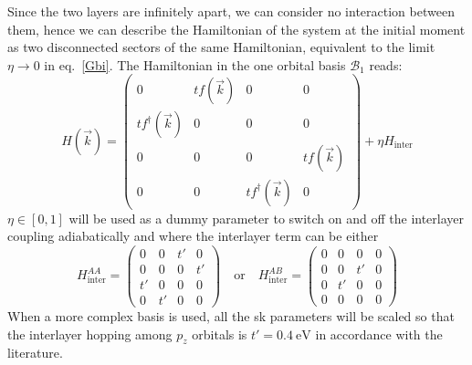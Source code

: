Since the two layers are infinitely apart, we can consider no interaction between them, hence we can describe the Hamiltonian of the system at the initial moment as two disconnected sectors of the same Hamiltonian, equivalent to the limit $\eta\rightarrow0$ in eq.~\eqref{Gbi}. The Hamiltonian in the one orbital basis $\mathcal{B}_1$ reads:
\begin{equation}
   H(\vec{k}) = \left(\begin{array}{cc|cc}
     0 & tf(\vec{k}) & 0 & 0 \\
     tf^{\dagger}(\vec{k}) & 0 & 0 & 0 \\ \hline
     0 & 0 & 0 & tf(\vec{k}) \\
     0 & 0 & tf^{\dagger}(\vec{k}) & 0
  \end{array}\right) +
  \eta H_\text{inter}
\label{Gbi}
\end{equation}
$\eta\in[0,1]$ will be used as a dummy parameter to switch on and off the interlayer coupling adiabatically and where the interlayer term can be either
\begin{equation}
H^{AA}_\text{inter}=\left(\begin{array}{cc|cc}
                          0  & 0  & t' & 0 \\
                          0  & 0  & 0  & t'\\ \hline
                          t' & 0  & 0  & 0 \\
                          0  & t' & 0  & 0\end{array}\right)
\quad\text{or}\quad
H^{AB}_\text{inter}=\left(\begin{array}{c|cc|c}
                          0 & 0  & 0  & 0 \\ \hline
                          0 & 0  & t' & 0 \\
                          0 & t' & 0  & 0 \\ \hline
                          0 & 0  & 0  & 0\end{array}\right)
\end{equation}
When a more complex basis is used, all the \ac{sk} parameters will be scaled so that the interlayer hopping among $p_z$ orbitals is $t'=\SI{0.4}{\eV}$ in accordance with the literature\cite{KatsnelsonBook}.
















